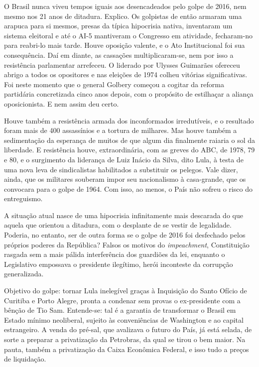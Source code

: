 
O Brasil nunca viveu tempos iguais aos desencadeados pelo golpe de 2016,
nem mesmo nos 21 anos de ditadura. Explico. Os golpistas de então
armaram uma arapuca para si mesmos, presas da típica hipocrisia nativa,
inventaram um sistema eleitoral e até o AI-5 mantiveram o Congresso em
atividade, fecharam-no para reabri-lo mais tarde. Houve oposição
valente, e o Ato Institucional foi sua consequência. Daí em diante, as
cassações multiplicaram-se, nem por isso a resistência parlamentar
arrefeceu. O  liderado por Ulysses Guimarães ofereceu abrigo a todos
os opositores e nas eleições de 1974 colheu vitórias significativas. Foi
neste momento que o general Golbery começou a cogitar da reforma
partidária concretizada cinco anos depois, com o propósito de estilhaçar
a aliança oposicionista. E nem assim deu certo.

Houve também a resistência armada dos inconformados irredutíveis, e o
resultado foram mais de 400 assassínios e a tortura de milhares. Mas
houve também a sedimentação da esperança de muitos de que algum dia
finalmente raiaria o sol da liberdade. E resistência houve,
extraordinária, com as greves do ABC, de 1978, 79 e 80, e o surgimento
da liderança de Luiz Inácio da Silva, dito Lula, à testa de uma nova
leva de sindicalistas habilitados a substituir os pelegos. Vale dizer,
ainda, que os militares souberam impor seu nacionalismo à casa-grande,
que os convocara para o golpe de 1964. Com isso, ao menos, o País não
sofreu o risco do entreguismo.

A situação atual nasce de uma hipocrisia infinitamente mais descarada do
que aquela que orientou a ditadura, com o desplante de se vestir de
legalidade. Poderia, no entanto, ser de outra forma se o golpe de 2016
foi desfechado pelos próprios poderes da República? Falsos os motivos do
\emph{impeachment}, Constituição rasgada sem a mais pálida interferência
dos guardiões da lei, enquanto o Legislativo empossava o presidente
ilegítimo, herói inconteste da corrupção generalizada.

Objetivo do golpe: tornar Lula inelegível graças à Inquisição do Santo
Ofício de Curitiba e Porto Alegre, pronta a condenar sem provas o
ex-presidente com a bênção de Tio Sam. Entende-se: tal é a garantia de
transformar o Brasil em Estado mínimo neoliberal, sujeito às
conveniências de Washington e ao capital estrangeiro. A venda do
pré-sal, que avalizava o futuro do País, já está selada, de sorte a
preparar a privatização da Petrobras, da qual se tirou o bem maior. Na
pauta, também a privatização da Caixa Econômica Federal, e isso tudo a
preços de liquidação.

